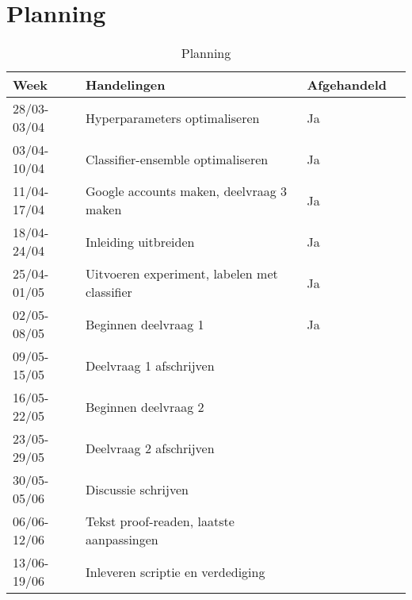 \documentclass[../main.tex]{subfiles}
\begin{document}
\section{Planning}

\begin{table}[!b]
\centering
\caption{Planning}
\label{tab:planning}
\begin{tabular}{@{}ll@{}ll@{}}
\toprule
Week        & Handelingen                                                     & Afgehandeld \\ \midrule
28/03-03/04 & Hyperparameters optimaliseren                                   &     Ja      \\
03/04-10/04 & Classifier-ensemble optimaliseren                               &     Ja      \\
11/04-17/04 & Google accounts maken, deelvraag 3 maken                        &     Ja      \\
18/04-24/04 & Inleiding uitbreiden                                            &     Ja      \\
25/04-01/05 & Uitvoeren experiment, labelen met classifier                    &     Ja      \\
02/05-08/05 & Beginnen deelvraag 1                                            &     Ja      \\
09/05-15/05 & Deelvraag 1 afschrijven                                         &             \\
16/05-22/05 & Beginnen deelvraag 2                                            &             \\
23/05-29/05 & Deelvraag 2 afschrijven                                         &             \\
30/05-05/06 & Discussie schrijven                                             &             \\
06/06-12/06 & Tekst proof-readen, laatste aanpassingen                        &             \\
13/06-19/06 & Inleveren scriptie en verdediging                               &             \\ \bottomrule
\end{tabular}

\end{table}
\end{document}

